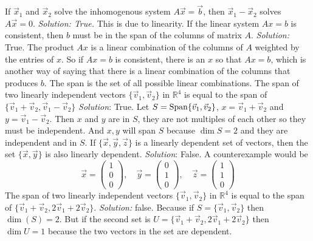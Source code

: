 \ifnum {} 
     If $ \vec x_1$ and $\vec x_2$ solve the inhomogenous system $A\vec x = \vec b$, then $\vec x_1 - \vec x_2$ solves $A \vec x = 0$. 
    \ifnum {} {\color{DarkBlue} \textit{Solution: True.} 
    This is due to linearity.} \fi
\fi     
\ifnum {}
    If the linear system $Ax=b$ is consistent, then $b$ must be in the span of the columns of matrix $A$.
    \ifnum {} {\color{DarkBlue} \textit{Solution:  } True. The product $Ax$ is a linear combination of the columns of $A$ weighted by the entries of $x$. So if $Ax=b$ is consistent, there is an $x$ so that $Ax=b$, which is another way of saying that there is a linear combination of the columns that produces $b$. The span is the set of all possible linear combinations. } \fi
\fi     
\ifnum {}
  The span of two linearly independent vectors $\{\vec v_1, \vec v_2\} $ in $\mathbb R^4$ 
  is equal to the span of $\{\vec v_1 + \vec v_2, \vec v_1 - \vec v_2 \}$
    \ifnum {} {\color{DarkBlue} \textit{Solution}: True. Let $S = \text{Span} \{\vec v_1 , \vec v_2 \}$, $ x = \vec v_1 + \vec v_2$ and $y = \vec v_1 - \vec v_2$. Then $x$ and $y$ are in $S$, they are not multiples of each other so they must be independent. And $x, y$ will span $S$ because $\dim S = 2$ and they are independent and in $S$.  
    } \fi
\fi     
\ifnum {}
    If $\{\vec x,\vec y,\vec z\}$ is a linearly dependent set of vectors, then the set $\{\vec x, \vec y\}$ is also linearly dependent.
    \ifnum {} {\color{DarkBlue} \textit{Solution}: False. A counterexample would be $$\vec x = \begin{pmatrix}1\\0\\0 \end{pmatrix}, \quad \vec y = \begin{pmatrix} 0\\1\\0 \end{pmatrix}, \quad \vec z = \begin{pmatrix} 1\\1\\0\end{pmatrix}$$
    } \fi
\fi     
\ifnum {}
    The span of two linearly independent vectors $\{\vec v_1, \vec v_2\} $ in $\mathbb R^4$ is equal to the span of $\{\vec v_1 + \vec v_2, 2\vec v_1 +2\vec v_2 \}$.
    \ifnum {} {\color{DarkBlue} \textit{Solution:  } false. Because if $S = \{\vec v_1 , \vec v_2 \}$ then $\dim(S) = 2$. But if the second set is $U = \{\vec v_1 + \vec v_2, 2\vec v_1 +2\vec v_2 \}$ then $\dim U = 1$ because the two vectors in the set are dependent.  } \fi
